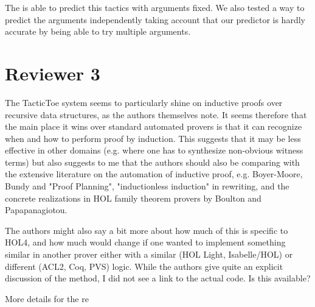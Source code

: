 \documentclass[]{scrartcl}
\begin{document}
The is able to predict this tactics with arguments fixed. We also tested a way 
to predict the arguments independently taking account that our predictor is 
hardly accurate by being able to try multiple arguments.



\section*{Reviewer 3}

\begin{leftbar}
The TacticToe system seems to particularly shine on inductive proofs over
recursive data structures, as the authors themselves note. It seems
therefore that the main place it wins over standard automated provers is
that it can recognize when and how to perform proof by induction. This
suggests that it may be less effective in other domains (e.g. where one has
to synthesize non-obvious witness terms) but also suggests to me that the
authors should also be comparing with the extensive literature on the
automation of inductive proof, e.g. Boyer-Moore, Bundy and "Proof
Planning", "inductionless induction" in rewriting, and the concrete
realizations in HOL family theorem provers by Boulton and Papapanagiotou.

The authors might also say a bit more about how much of this is specific to
HOL4, and how much would change if one wanted to implement something
similar in another prover either with a similar (HOL Light, Isabelle/HOL)
or different (ACL2, Coq, PVS) logic. While the authors give quite an
explicit discussion of the method, I did not see a link to the actual code.
Is this available?
\end{leftbar}

More details for the re
\end{document}
